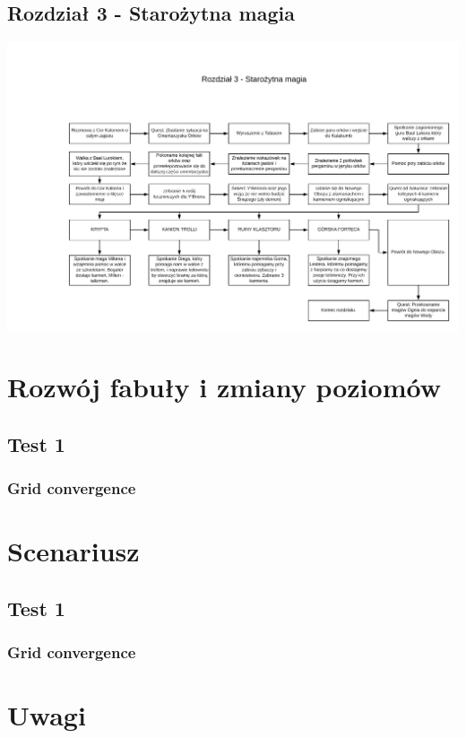 \documentclass[11pt,polish, openany]{book}
\begin{document}
\section{Rozdział 3 - Starożytna magia}
\begin{center}
\includegraphics[scale=0.16, angle=90]{rozdzial3}
\end{center}
\chapter{Rozwój fabuły i zmiany poziomów}\label{chapt:results}
\section{Test 1}
\subsection{Grid convergence}

\chapter{Scenariusz}\label{chapt:results}
\section{Test 1}
\subsection{Grid convergence}
\chapter{Uwagi}

\pagebreak
\end{document}
